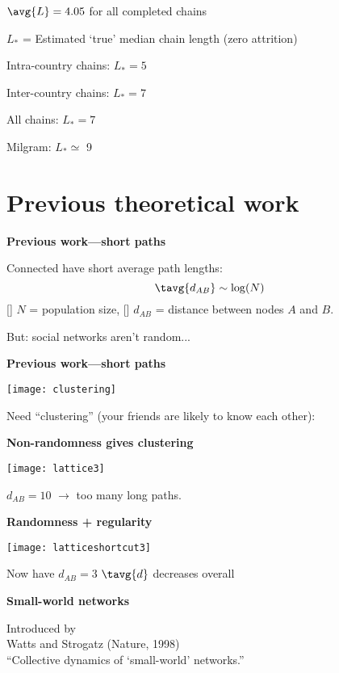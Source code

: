       $\avg{L} = 4.05$ for all completed chains
    
      $L_\ast$ = Estimated `true' median chain length (zero attrition)
    
      Intra-country chains: $L_\ast = 5$ 
    
      Inter-country chains:
      $L_\ast = 7$ 
    
      All chains:
      $L_\ast = 7$ 
    
      Milgram:
      $L_\ast \simeq$ 9
    
  


\section{Previous theoretical work}

  \textbf{Previous work---short paths}
  
  
  
    Connected 
    have short average path lengths:
    $$\tavg{d_{AB}} \sim \log(N)$$
  []
    $N$ = population size,
  []
    $d_{AB}$ = distance between nodes $A$ and $B$.
  
  \alert{But: social networks aren't random...}
  




  \textbf{Previous work---short paths}

      
    \texttt{[image: clustering]}
    
    Need \alert{``clustering''} (your friends are likely to know each other):
  


  \textbf{Non-randomness gives clustering}

  \begin{center}
    \texttt{[image: lattice3]}
  \end{center}

  $d_{AB}=10$ $\rightarrow$ too many long paths.


  \textbf{Randomness + regularity}

  \begin{center}
    \texttt{[image: latticeshortcut3]}
  \end{center}

  \alert{Now have $d_{AB}=3$}
  \hfill $\tavg{d}$ decreases overall

  \textbf{Small-world networks}

  Introduced by\\
  Watts and Strogatz (Nature, 1998)\cite{watts1998a}\\
  ``Collective dynamics of `small-world' networks.''

